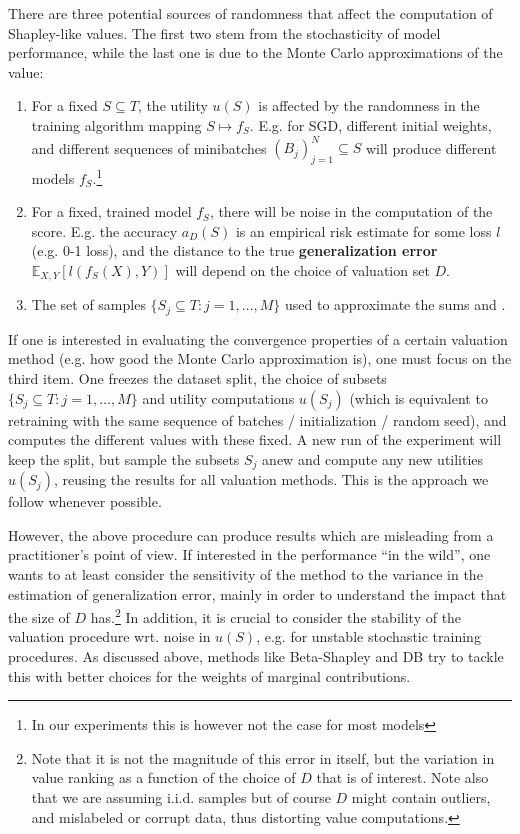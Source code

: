 \documentclass[10pt]{article}
\newcommand{\tmdfn}[1]{\textbf{#1}}
\begin{document}
There are three potential sources of randomness that affect the computation of
Shapley-like values. The first two stem from the stochasticity of model
performance, while the last one is due to the Monte Carlo approximations of
the value:
\begin{enumerate}
  \item For a fixed $S \subseteq T$, the utility $u (S)$ is affected by the
  randomness in the training algorithm mapping $S \mapsto f_S$. E.g. for SGD,
  different initial weights, and different sequences of minibatches $(B_j)_{j
  = 1}^N \subseteq S$ will produce different models $f_S$.\footnote{In our
  experiments this is however not the case for most models}

  \item For a fixed, trained model $f_S $, there will be noise in the
  computation of the score. E.g. the accuracy $a_D (S)$ is an empirical risk
  estimate for some loss $l$ (e.g. 0-1 loss), and the distance to the true
  {\tmdfn{generalization error}} $\mathbb{E}_{X, Y} [l (f_S (X), Y)]$ will
  depend on the choice of valuation set $D$.

  \item The set of samples $\{ S_j \subseteq T : j = 1, \ldots, M \}$ used to
  approximate the sums  and .
\end{enumerate}
If one is interested in evaluating the convergence properties of a certain
valuation method (e.g. how good the Monte Carlo approximation is), one must
focus on the third item. One freezes the dataset split, the choice of subsets
$\{ S_j \subseteq T : j = 1, \ldots, M \}$ and utility computations $u (S_j)$
(which is equivalent to retraining with the same sequence of batches /
initialization / random seed), and computes the different values with these
fixed. A new run of the experiment will keep the split, but sample the subsets
$S_j$ anew and compute any new utilities $u (S_j)$, reusing the results for
all valuation methods. This is the approach we follow whenever possible.

However, the above procedure can produce results which are misleading from a
practitioner's point of view. If interested in the performance ``in the
wild'', one wants to at least consider the sensitivity of the method to the
variance in the estimation of generalization error, mainly in order to
understand the impact that the size of $D$ has.\footnote{Note that it is not
the magnitude of this error in itself, but the variation in value ranking as a
function of the choice of $D$ that is of interest. Note also that we are
assuming i.i.d. samples but of course $D$ might contain outliers, and
mislabeled or corrupt data, thus distorting value computations.} In addition,
it is crucial to consider the stability of the valuation procedure wrt. noise
in $u (S)$, e.g. for unstable stochastic training procedures. As discussed
above, methods like Beta-Shapley and DB try to tackle this with better choices
for the weights of marginal contributions.
\end{document}
